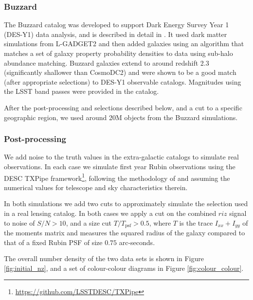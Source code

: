 \documentclass[twocolumn,twocolappendix]{aastex63}
\begin{document}
\subsubsection{Buzzard}

The Buzzard catalog was developed to support Dark Energy Survey Year 1 (DES-Y1)
data analysis, and is described in detail in \citet{buzzard}.  It used dark
matter simulations from L-GADGET2 \cite{gadget2} and then added galaxies using
an algorithm that matches a set of galaxy
property probability densities to data using sub-halo abundance matching. 
Buzzard galaxies extend to around redshift 2.3 (significantly shallower than CosmoDC2)
and were shown to be a good
match (after appropriate selections) to DES-Y1 observable catalogs.  Magnitudes
using the LSST band passes were provided in the catalog.

After the post-processing and selections described below, and a cut to a
specific geographic region,  we used around 20M objects from the Buzzard
simulations.


\subsubsection{Post-processing} \label{sec:data-proc}

We add noise to the truth values in the extra-galactic catalogs to simulate real observations.
In each case we simulate first year Rubin observations
using the DESC {\sc TXPipe} framework\footnote{\url{https://github.com/LSSTDESC/TXPipe}}, following the methodology of \citet{ivezic_jones_lupton}
and assuming the numerical values for telescope and sky characteristics therein.

In both simulations we add two cuts to approximately simulate the selection used in a real
lensing catalog.  In both cases we apply a cut on the combined $riz$ signal to noise of
$S/N > 10$, and a size cut $T / T_\mathrm{psf} > 0.5$, where
$T$ is the trace $I_{xx} + I_{yy}$ of the moments matrix and measures the squared radius of the
galaxy compared to that of a fixed Rubin PSF of size $0.75$ arc-seconds.

The overall number density of the two data sets is shown in Figure \ref{fig:initial_nz},
and a set of colour-colour diagrams  in Figure \ref{fig:colour_colour}.
\end{document}
